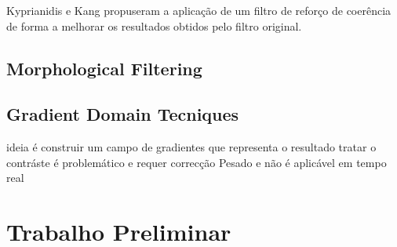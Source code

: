 Kyprianidis e Kang \cite{KK} propuseram a aplicação de um filtro de reforço de coerência de forma a melhorar os resultados obtidos pelo filtro original.

\subsection{Morphological Filtering}

\subsection{Gradient Domain Tecniques}
ideia é construir um campo de gradientes que representa o resultado tratar o contráste é problemático e requer correcção
Pesado e não é aplicável em tempo real


\section{Trabalho Preliminar}